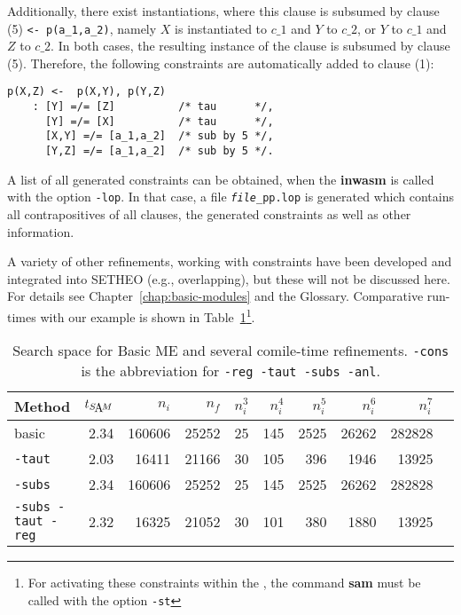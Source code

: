 Additionally, there exist instantiations, where this clause is subsumed
by clause (5) {\verb+<- p(a_1,a_2)+}, namely $X$ is instantiated
to $c\_1$ and $Y$ to $c\_2$, or $Y$ to $c\_1$ and $Z$ to $c\_2$.
In both cases, the resulting instance of the clause is subsumed by
clause (5).
Therefore, the following constraints are automatically added to
clause (1):

\begin{center}
\begin{verbatim}
p(X,Z) <-  p(X,Y), p(Y,Z)
    : [Y] =/= [Z]          /* tau      */, 
      [Y] =/= [X]          /* tau      */, 
      [X,Y] =/= [a_1,a_2]  /* sub by 5 */, 
      [Y,Z] =/= [a_1,a_2]  /* sub by 5 */.
\end{verbatim}
\end{center}

A list of all generated constraints can be obtained, when the {\bf inwasm}
is called with the option {\tt -lop}. In that case, a file 
{\tt {\em file}\_pp.lop} is generated which contains all contrapositives
of all clauses, the generated constraints as well as other information.

A variety of other refinements, working with constraints have been
developed and integrated into SETHEO (e.g., overlapping), 
but these will not be discussed
here. For details see Chapter~\ref{chap:basic-modules} and the Glossary.
Comparative run-times with our example is shown in 
Table~\ref{tab:tut2:results.constr}\footnote{
	For activating these constraints within the \SAM, the command
	{\bf sam} must be called with the option {\tt -st}}.

\begin{table}[htb]
\begin{center}
\begin{tabular}{|l|r|r|r||r|r|r|r|r|r|}
\hline
Method & $t_{\SAM}$ & $n_i$ & $n_f$ & 
	$n_i^3$ & $n_i^4$ & $n_i^5$ & $n_i^6$ & $n_i^7$ \\
\hline\hline
basic & 2.34 & 160606 & 25252 &
	25 & 145 & 2525 & 26262 & 282828 \\
\hline
{\tt -taut} & 2.03 & 16411 & 21166 &
	30 & 105 & 396 & 1946 & 13925 \\
\hline
{\tt -subs} & 2.34 & 160606 & 25252 &
	25 & 145 & 2525 & 26262 & 282828 \\
\hline
{\tt -subs -taut -reg} & 2.32 & 16325 & 21052 &
	30 & 101 & 380 & 1880 & 13925 \\
\hline\hline
\end{tabular}
\end{center}
\caption{Search space for Basic ME and several comile-time
refinements. {\tt -cons} is the abbreviation for
	{\tt -reg -taut -subs -anl}.}
\label{tab:tut2:results.constr}
\end{table}

